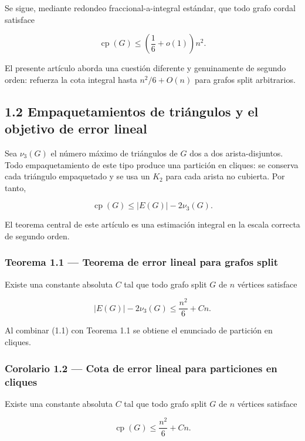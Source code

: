 \documentclass[
  11pt,
]{article}
\begin{document}
Se sigue, mediante redondeo fraccional-a-integral estándar, que todo grafo cordal satisface

\[
\operatorname{cp}(G)
\le
\left(\frac16+o(1)\right)n^2.
\]

El presente artículo aborda una cuestión diferente y genuinamente de segundo orden: refuerza la cota integral hasta \(n^2/6+O(n)\) para grafos split arbitrarios.

\subsection{1.2 Empaquetamientos de triángulos y el objetivo de error lineal}\label{empaquetamientos-de-triuxe1ngulos-y-el-objetivo-de-error-lineal}

Sea \(\nu_3(G)\) el número máximo de triángulos de \(G\) dos a dos arista-disjuntos. Todo empaquetamiento de este tipo produce una partición en cliques: se conserva cada triángulo empaquetado y se usa un \(K_2\) para cada arista no cubierta. Por tanto,

\[
\operatorname{cp}(G)
\le
|E(G)|-2\nu_3(G).
\tag{1.1}
\]

El teorema central de este artículo es una estimación integral en la escala correcta de segundo orden.

\subsubsection{Teorema 1.1 --- Teorema de error lineal para grafos split}\label{teorema-1.1-teorema-de-error-lineal-para-grafos-split}

Existe una constante absoluta \(C\) tal que todo grafo split \(G\) de \(n\) vértices satisface

\[
\boxed{
|E(G)|-2\nu_3(G)
\le
\frac{n^2}{6}+Cn.
}
\tag{1.2}
\]

Al combinar (1.1) con Teorema 1.1 se obtiene el enunciado de partición en cliques.

\subsubsection{Corolario 1.2 --- Cota de error lineal para particiones en cliques}\label{corolario-1.2-cota-de-error-lineal-para-particiones-en-cliques}

Existe una constante absoluta \(C\) tal que todo grafo split \(G\) de \(n\) vértices satisface

\[
\boxed{
\operatorname{cp}(G)
\le
\frac{n^2}{6}+Cn.
}
\tag{1.3}
\]
\end{document}
